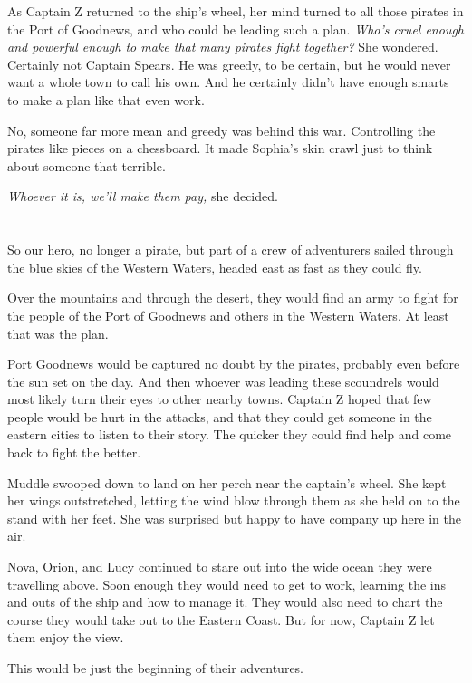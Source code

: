 \documentclass[12pt]{extbook}
\begin{document}
  As Captain Z returned to the ship's wheel, her mind turned to all those
  pirates in the Port of Goodnews, and who could be leading such a plan.
  \emph{Who's cruel enough and powerful enough to make that many pirates
  fight together?} She wondered. Certainly not Captain Spears. He was
  greedy, to be certain, but he would never want a whole town to call his
  own. And he certainly didn't have enough smarts to make a plan like that
  even work.
  
  No, someone far more mean and greedy was behind this war. Controlling
  the pirates like pieces on a chessboard. It made Sophia's skin crawl
  just to think about someone that terrible.
  
  \emph{Whoever it is, we'll make them pay,} she decided.
  
  \section{}\label{section-44}
  
  So our hero, no longer a pirate, but part of a crew of adventurers
  sailed through the blue skies of the Western Waters, headed east as fast
  as they could fly.
  
  Over the mountains and through the desert, they would find an army to
  fight for the people of the Port of Goodnews and others in the Western
  Waters. At least that was the plan.
  
  Port Goodnews would be captured no doubt by the pirates, probably even
  before the sun set on the day. And then whoever was leading these
  scoundrels would most likely turn their eyes to other nearby towns.
  Captain Z hoped that few people would be hurt in the attacks, and that
  they could get someone in the eastern cities to listen to their story.
  The quicker they could find help and come back to fight the better.
  
  Muddle swooped down to land on her perch near the captain's wheel. She
  kept her wings outstretched, letting the wind blow through them as she
  held on to the stand with her feet. She was surprised but happy to have
  company up here in the air.
  
  Nova, Orion, and Lucy continued to stare out into the wide ocean they
  were travelling above. Soon enough they would need to get to work,
  learning the ins and outs of the ship and how to manage it. They would
  also need to chart the course they would take out to the Eastern Coast.
  But for now, Captain Z let them enjoy the view.
  
  This would be just the beginning of their adventures.
\end{document}
